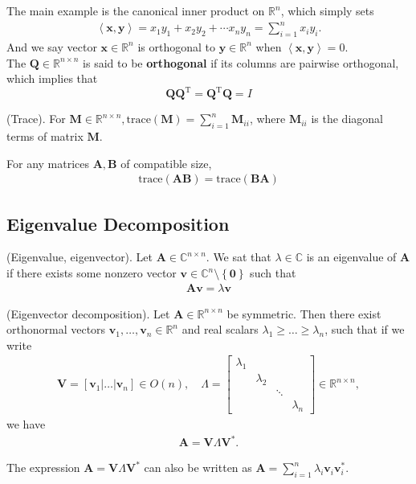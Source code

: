 \documentclass[10pt]{article}
\begin{document}
The main example is the canonical inner product on $\mathbb{R}^{n}$, which simply sets
\begin{align*}
\left<\bm{x}, \bm{y}\right> =x_1 y_1 + x_2 y_2 + \cdots x_n y_n = \sum_{i=1}^{n} x_i y_i.
\end{align*}
And we say vector $\bm{x}\in\mathbb{R}^n$ is orthogonal to $\bm{y}\in\mathbb{R}^n$ when $\left<\bm{x}, \bm{y}\right>=0$.\\
The $\mathbf{Q} \in \mathbb{R}^{n \times n}$ is said to be \textbf{orthogonal} if its columns are pairwise orthogonal, which implies that 
\begin{equation*}
\mathbf{Q}\mathbf{Q}^{\mathrm{T}} = \mathbf{Q}^{\mathrm{T}}\mathbf{Q} = I
\end{equation*}
\begin{definition}(Trace).
For $\mathbf{M} \in \mathbb{R}^{n\times n} , \mathrm{trace}(\mathbf{M}) = \sum\limits_{i=1}^n \mathbf{M}_{ii}$, where $\mathbf{M}_{ii}$ is the diagonal terms of matrix $\mathbf{M}$.
\end{definition}
\begin{theorem}
 For any matrices $\mathbf{A}, \mathbf{B}$ of compatible size,
 \begin{align*}
     \mathrm{trace}(\mathbf{A}\mathbf{B})=\mathrm{trace}(\mathbf{B}\mathbf{A})
 \end{align*}
\end{theorem}


\subsection{Eigenvalue Decomposition}
\begin{definition}
(Eigenvalue, eigenvector). Let $\bm{A}\in \mathbb{C}^{n\times n}.$ We sat that $\lambda \in \mathbb{C}$ is an eigenvalue of $\bm{A}$ if there exists some nonzero vector $\bm{v}\in \mathbb{C}^{n}\setminus \left\{\bm{0}\right\}$ such that
\begin{align*}
    \bm{A}\bm{v} = \lambda\bm{v}
\end{align*}
\end{definition}

\begin{theorem}
 (Eigenvector decomposition). Let $\bm{A}\in\mathbb{R}^{n\times n}$ be symmetric. Then there exist orthonormal vectors $\bm{v}_1,\dots,\bm{v}_n \in \mathbb{R}^n$ and real scalars $\lambda_1 \geq\dots\geq \lambda_n$, such that if we write
 \begin{align*}
     \bm{V} = \left[\bm{v}_1|\dots|\bm{v}_n\right]\in O(n), \quad
     \Lambda = \begin{bmatrix} \lambda_1&&&\\&\lambda_2&&\\&&\ddots&\\&&&\lambda_n \end{bmatrix}\in \mathbb{R}^{n\times n},
 \end{align*}
 we have
 \begin{align*}
     \bm{A} = \bm{V}\Lambda\bm{V}^{*}.
 \end{align*}
\end{theorem}
The expression $\bm{A} = \bm{V}\Lambda\bm{V}^{*}$ can also be written as $\bm{A}=\sum\limits_{i=1}^{n}\lambda_i \bm{v}_i \bm{v}_i^*$.
\end{document}
